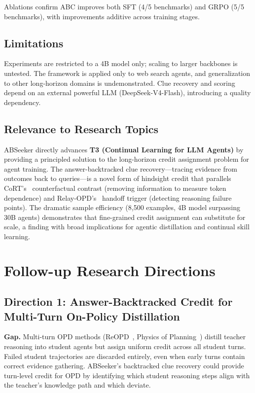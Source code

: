 \documentclass[11pt,a4paper]{article}
\begin{document}
Ablations confirm ABC improves both SFT (4/5 benchmarks) and GRPO (5/5 benchmarks), with improvements additive across training stages.

\subsection{Limitations}
Experiments are restricted to a 4B model only; scaling to larger backbones is untested. The framework is applied only to web search agents, and generalization to other long-horizon domains is undemonstrated. Clue recovery and scoring depend on an external powerful LLM (DeepSeek-V4-Flash), introducing a quality dependency.

\subsection{Relevance to Research Topics}
ABSeeker directly advances \textbf{T3 (Continual Learning for LLM Agents)} by providing a principled solution to the long-horizon credit assignment problem for agent training. The answer-backtracked clue recovery---tracing evidence from outcomes back to queries---is a novel form of hindsight credit that parallels CoRT's~\cite{cort2026} counterfactual contrast (removing information to measure token dependence) and Relay-OPD's~\cite{relayopd2026} handoff trigger (detecting reasoning failure points). The dramatic sample efficiency (8,500 examples, 4B model surpassing 30B agents) demonstrates that fine-grained credit assignment can substitute for scale, a finding with broad implications for agentic distillation and continual skill learning.

\section{Follow-up Research Directions}

\subsection{Direction 1: Answer-Backtracked Credit for Multi-Turn On-Policy Distillation}

\textbf{Gap.} Multi-turn OPD methods (ReOPD~\cite{reopd2026}, Physics of Planning~\cite{physicsplanning2026}) distill teacher reasoning into student agents but assign uniform credit across all student turns. Failed student trajectories are discarded entirely, even when early turns contain correct evidence gathering. ABSeeker's backtracked clue recovery could provide turn-level credit for OPD by identifying which student reasoning steps align with the teacher's knowledge path and which deviate.
\end{document}
